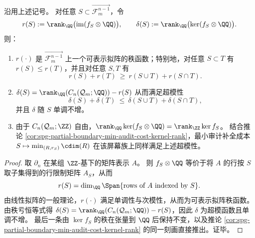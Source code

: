\begin{theorem}[可见秩函数的可表示拟阵性与审计缺口的超模性]\label{thm:spg-screen-rank-matroid-supermodularity}
沿用上述记号。
对任意 \(S\subset \overrightarrow{\mathcal F_{m}^{n-1}}\)，令
\[
r(S):=\rank_{\QQ}\bigl(\mathrm{im}(f_S\otimes\QQ)\bigr),
\qquad
\delta(S):=\rank_{\QQ}\bigl(\ker(f_S\otimes\QQ)\bigr).
\]
则：
\begin{enumerate}
  \item \(r(\cdot)\) 是 \(\overrightarrow{\mathcal F_{m}^{n-1}}\) 上一个可表示拟阵的秩函数；特别地，对任意 \(S\subset T\) 有 \(r(S)\le r(T)\)，并且对任意 \(S,T\) 有
        \[
        r(S)+r(T)\ \ge\ r(S\cup T)+r(S\cap T).
        \]
  \item \(\delta(S)=\rank_{\QQ}(C_n(\mathcal Q_m;\QQ)) - r(S)\) 从而满足超模性
        \[
        \delta(S)+\delta(T)\ \le\ \delta(S\cup T)+\delta(S\cap T),
        \]
        并且 \(\delta\) 随 \(S\) 单调不增。
  \item 由于 \(C_n(\mathcal Q_m;\ZZ)\) 自由，\(\rank_{\QQ}\ker(f_S\otimes\QQ)=\rank_{\ZZ}\ker f_S\)。
        结合推论 \ref{cor:spg-partial-boundary-min-audit-cost-kernel-rank}，最小审计补全成本 \(S\mapsto \min_{(R,r_S)}\cdim(R)\) 在该屏幕族上同样满足上述超模性。
\end{enumerate}
\end{theorem}
\begin{proof}
取 \(\partial_n\) 在某组 \(\ZZ\)-基下的矩阵表示 \(A\)。
则 \(f_S\otimes\QQ\) 等价于将 \(A\) 的行按 \(S\) 取子集得到的行限制矩阵 \(A_S\)，从而
\[
r(S)=\dim_{\QQ}\Span\{\text{rows of }A\text{ indexed by }S\}.
\]
由线性拟阵的一般理论，\(r(\cdot)\) 满足单调性与次模性，从而为可表示拟阵秩函数。
由秩亏恒等式得 \(\delta(S)=\rank_{\QQ}(C_n(\mathcal Q_m;\QQ))-r(S)\)，因此 \(\delta\) 为超模函数且单调不增。
最后一条由 \(\ker f_S\) 的秩在张量到 \(\QQ\) 后保持不变，以及推论 \ref{cor:spg-partial-boundary-min-audit-cost-kernel-rank} 的同一刻画直接推出。证毕。
\end{proof}

